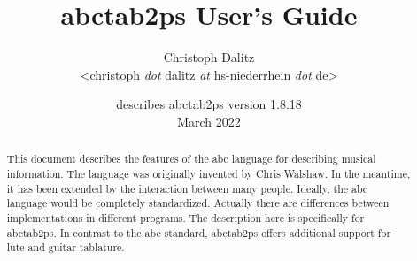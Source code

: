 \documentclass[a4paper]{article}
\begin{document}
\title{\vspace*{-8mm}
abctab2ps User's Guide}
\author{
Christoph Dalitz
\\\textless christoph {\it dot} dalitz {\it at} hs-niederrhein {\it dot} de\textgreater
}
\date{describes abctab2ps version 1.8.18\\[1.0ex]
March 2022}
\maketitle


\begin{abstract}
\noindent
This document describes the features of the abc language for describing
musical information. The language was originally invented by Chris Walshaw.
In the meantime, it has been extended by the interaction between
many people. Ideally, the abc language would be completely standardized.
Actually there are differences between implementations in different programs.
The description here is specifically for abctab2ps. In contrast to the
abc standard, abctab2ps offers additional support for lute and guitar
tablature.
\end{abstract}


\tableofcontents

\end{document}
